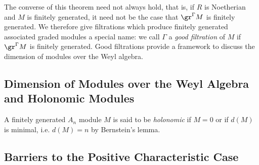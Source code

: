 The converse of this theorem need not always hold, that is, if $R$ is Noetherian and $M$ is finitely generated, it need not be the case that $\gr^{\Gamma}M$ is finitely generated. We therefore give filtrations which produce finitely generated associated graded modules a special name: we call $\Gamma$ a \emph{good filtration} of $M$ if $\gr^\Gamma M$ is finitely generated. Good filtrations provide a framework to discuss the dimension of modules over the Weyl algebra.

\subsection{Dimension of Modules over the Weyl Algebra and Holonomic Modules}

\begin{defn}\label{defn:holonomic}
	A finitely generated $A_n$ module $M$ is said to be \emph{holonomic} if $M = 0$ or if $d(M)$ is minimal, i.e. $d(M) = n$ by Bernstein's lemma.
\end{defn}

\subsection{Barriers to the Positive Characteristic Case}
\newpage
\printbibliography

